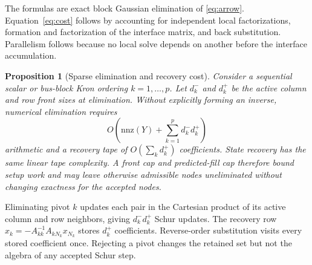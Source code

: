 \documentclass[journal,10pt]{IEEEtran}
\newtheorem{proposition}{Proposition}
\begin{document}
\begin{IEEEproof}
The formulas are exact block Gaussian elimination of \eqref{eq:arrow}.
Equation~\eqref{eq:cost} follows by accounting for independent local
factorizations, formation and factorization of the interface matrix, and back
substitution.  Parallelism follows because no local solve depends on another
before the interface accumulation.
\end{IEEEproof}

\begin{proposition}[Sparse elimination and recovery cost]\label{prop:complexity}
Consider a sequential scalar or bus-block Kron ordering $k=1,\ldots,p$.  Let
$d_k^-$ and $d_k^+$ be the active column and row front sizes at elimination.
Without explicitly forming an inverse, numerical elimination requires
\begin{equation}
 O\!\left(\mathrm{nnz}(Y)+\sum_{k=1}^{p}d_k^-d_k^+\right)
 \label{eq:reduction_cost}
\end{equation}
arithmetic and a recovery tape of $O(\sum_k d_k^+)$ coefficients.  State
recovery has the same linear tape complexity.  A front cap and predicted-fill
cap therefore bound setup work and may leave otherwise admissible nodes
uneliminated without changing exactness for the accepted nodes.
\end{proposition}

\begin{IEEEproof}
Eliminating pivot $k$ updates each pair in the Cartesian product of its active
column and row neighbors, giving $d_k^-d_k^+$ Schur updates.  The recovery row
$x_k=-A_{kk}^{-1}A_{kN_k}x_{N_k}$ stores $d_k^+$ coefficients.  Reverse-order
substitution visits every stored coefficient once.  Rejecting a pivot changes
the retained set but not the algebra of any accepted Schur step.
\end{IEEEproof}
\end{document}
